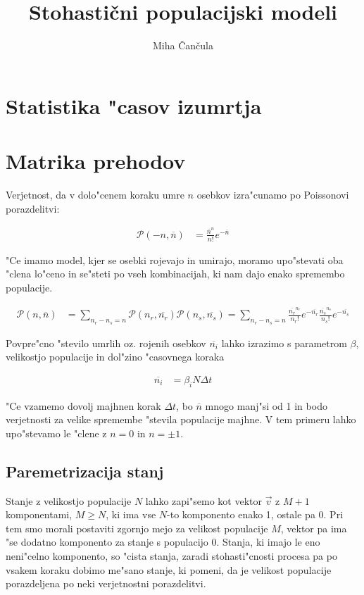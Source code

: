 \documentclass[a4paper,10pt]{article}
\title{Stohasti\v cni populacijski modeli}
\author{Miha \v Can\v cula}
\begin{document}
\maketitle

\newcommand{\poisson}[2]{
  \frac{#2^{#1}}{#1!} e^{-#2}  
}

\newcommand{\poi}[1]{\poisson{#1}{\overline{#1}}}

\section{Statistika "casov izumrtja}

\section{Matrika prehodov}

Verjetnost, da v dolo"cenem koraku umre $n$ osebkov izra"cunamo po Poissonovi porazdelitvi:

\begin{align}
\mathcal P(-n, \overline n) &= \poi{n}
\end{align}

"Ce imamo model, kjer se osebki rojevajo in umirajo, moramo upo"stevati oba "clena lo"ceno in se"steti po vseh kombinacijah, ki nam dajo enako spremembo populacije. 

\begin{align}
\mathcal P(n, \overline n) &= \sum_{n_r - n_s = n}\mathcal{P}(n_r, \overline{n_r})\mathcal{P}(n_s, \overline{n_s}) = \sum_{n_r - n_s = n}\poi{n_r}\poi{n_s}  
\end{align}

Povpre"cno "stevilo umrlih oz. rojenih osebkov $\overline{n_i}$ lahko izrazimo s parametrom $\beta$, velikostjo populacije in dol"zino "casovnega koraka

\begin{align}
  \overline{n_i} &= \beta_i N \Delta t
\end{align}

"Ce vzamemo dovolj majhnen korak $\Delta t$, bo $\overline{n}$ mnogo manj"si od 1 in bodo verjetnosti za velike spremembe "stevila populacije majhne. V tem primeru lahko upo"stevamo le "clene z $n=0$ in $n = \pm 1$. 

\subsection{Paremetrizacija stanj}

Stanje z velikostjo populacije $N$ lahko zapi"semo kot vektor $\vec v$ z $M+1$ komponentami, $M \geq N$, ki ima vse $N$-to komponento enako 1, ostale pa 0. Pri tem smo morali postaviti zgornjo mejo za velikost populacije $M$, vektor pa ima "se dodatno komponento za stanje s populacijo 0. Stanja, ki imajo le eno neni"celno komponento, so "cista stanja, zaradi stohasti"cnosti procesa pa po vsakem koraku dobimo me"sano stanje, ki pomeni, da je velikost populacije porazdeljena po neki verjetnostni porazdelitvi. 
\end{document}
